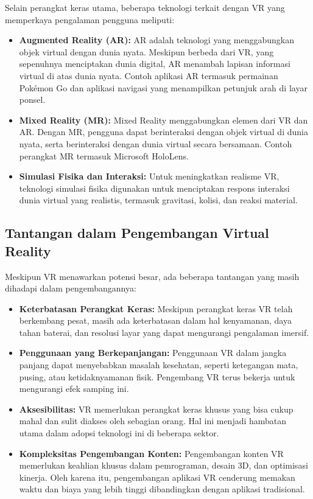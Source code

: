 Selain perangkat keras utama, beberapa teknologi terkait dengan VR yang memperkaya pengalaman pengguna meliputi:

\begin{itemize}
    \item \textbf{Augmented Reality (AR):} AR adalah teknologi yang menggabungkan objek virtual dengan dunia nyata. Meskipun berbeda dari VR, yang sepenuhnya menciptakan dunia digital, AR menambah lapisan informasi virtual di atas dunia nyata. Contoh aplikasi AR termasuk permainan Pokémon Go dan aplikasi navigasi yang menampilkan petunjuk arah di layar ponsel.
    \item \textbf{Mixed Reality (MR):} Mixed Reality menggabungkan elemen dari VR dan AR. Dengan MR, pengguna dapat berinteraksi dengan objek virtual di dunia nyata, serta berinteraksi dengan dunia virtual secara bersamaan. Contoh perangkat MR termasuk Microsoft HoloLens.
    \item \textbf{Simulasi Fisika dan Interaksi:} Untuk meningkatkan realisme VR, teknologi simulasi fisika digunakan untuk menciptakan respons interaksi dunia virtual yang realistis, termasuk gravitasi, kolisi, dan reaksi material.
\end{itemize}

\subsection{Tantangan dalam Pengembangan Virtual Reality}
\label{subsec:tantangan_vr}

Meskipun VR menawarkan potensi besar, ada beberapa tantangan yang masih dihadapi dalam pengembangannya:

\begin{itemize}
    \item \textbf{Keterbatasan Perangkat Keras:} Meskipun perangkat keras VR telah berkembang pesat, masih ada keterbatasan dalam hal kenyamanan, daya tahan baterai, dan resolusi layar yang dapat mengurangi pengalaman imersif.
    \item \textbf{Penggunaan yang Berkepanjangan:} Penggunaan VR dalam jangka panjang dapat menyebabkan masalah kesehatan, seperti ketegangan mata, pusing, atau ketidaknyamanan fisik. Pengembang VR terus bekerja untuk mengurangi efek samping ini.
    \item \textbf{Aksesibilitas:} VR memerlukan perangkat keras khusus yang bisa cukup mahal dan sulit diakses oleh sebagian orang. Hal ini menjadi hambatan utama dalam adopsi teknologi ini di beberapa sektor.
    \item \textbf{Kompleksitas Pengembangan Konten:} Pengembangan konten VR memerlukan keahlian khusus dalam pemrograman, desain 3D, dan optimisasi kinerja. Oleh karena itu, pengembangan aplikasi VR cenderung memakan waktu dan biaya yang lebih tinggi dibandingkan dengan aplikasi tradisional.
\end{itemize}

